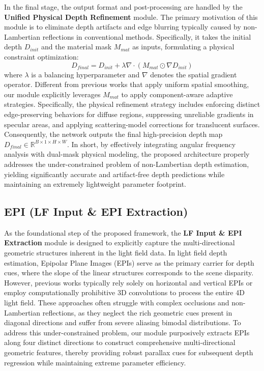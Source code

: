 In the final stage, the output format and post-processing are handled by the \textbf{Unified Physical Depth Refinement} module. The primary motivation of this module is to eliminate depth artifacts and edge blurring typically caused by non-Lambertian reflections in conventional methods. Specifically, it takes the initial depth $D_{init}$ and the material mask $M_{mat}$ as inputs, formulating a physical constraint optimization:
\begin{equation}
\label{eq:eq31}
D_{final} = D_{init} + \lambda \nabla \cdot (M_{mat} \odot \nabla D_{init})
\end{equation}
where $\lambda$ is a balancing hyperparameter and $\nabla$ denotes the spatial gradient operator. Different from previous works that apply uniform spatial smoothing, our module explicitly leverages $M_{mat}$ to apply component-aware adaptive strategies. Specifically, the physical refinement strategy includes enforcing distinct edge-preserving behaviors for diffuse regions, suppressing unreliable gradients in specular areas, and applying scattering-model corrections for translucent surfaces. Consequently, the network outputs the final high-precision depth map $D_{final} \in \mathbb{R}^{B \times 1 \times H \times W}$. In short, by effectively integrating angular frequency analysis with dual-mask physical modeling, the proposed architecture properly addresses the under-constrained problem of non-Lambertian depth estimation, yielding significantly accurate and artifact-free depth predictions while maintaining an extremely lightweight parameter footprint.

\subsection{EPI (LF Input \& EPI Extraction)}

As the foundational step of the proposed framework, the \textbf{LF Input & EPI Extraction} module is designed to explicitly capture the multi-directional geometric structures inherent in the light field data. In light field depth estimation, Epipolar Plane Images (EPIs) serve as the primary carrier for depth cues, where the slope of the linear structures corresponds to the scene disparity. However, previous works typically rely solely on horizontal and vertical EPIs or employ computationally prohibitive 3D convolutions to process the entire 4D light field. These approaches often struggle with complex occlusions and non-Lambertian reflections, as they neglect the rich geometric cues present in diagonal directions and suffer from severe aliasing bimodal distributions. To address this under-constrained problem, our module purposively extracts EPIs along four distinct directions to construct comprehensive multi-directional geometric features, thereby providing robust parallax cues for subsequent depth regression while maintaining extreme parameter efficiency.

